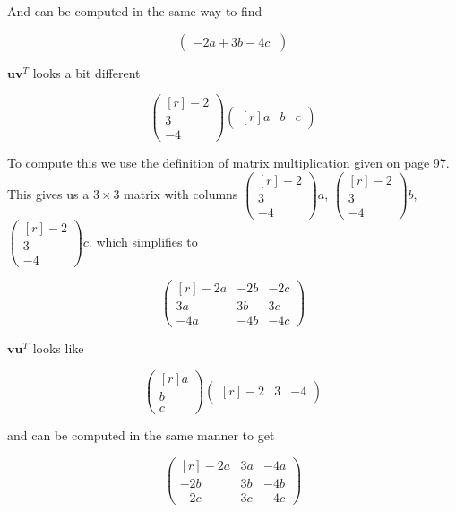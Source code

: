 \documentclass[11pt]{amsart}
\begin{document}
And can be computed in the same way to find

\[
\begin{pmatrix}
-2a+3b-4c\
\end{pmatrix}
\]

$\textbf{uv}^T$ looks a bit different 

\[
\begin{pmatrix*}[r]
-2\\
3\\
-4
\end{pmatrix*}
\begin{pmatrix*}[r]
a&b&c
\end{pmatrix*}
\]

To compute this we use the definition of matrix multiplication given on page 97. This gives us a $3\times3$ matrix with columns $
\begin{pmatrix*}[r]
-2\\
3\\
-4
\end{pmatrix*}a$, $
\begin{pmatrix*}[r]
-2\\
3\\
-4
\end{pmatrix*}b$, $
\begin{pmatrix*}[r]
-2\\
3\\
-4
\end{pmatrix*}c$. which simplifies to 

\[
\begin{pmatrix*}[r]
-2a&-2b&-2c\\
3a&3b&3c\\
-4a&-4b&-4c
\end{pmatrix*}
\]

$\textbf{vu}^T$ looks like 

\[
\begin{pmatrix*}[r]
a\\
b\\
c
\end{pmatrix*}
\begin{pmatrix*}[r]
-2&3&-4
\end{pmatrix*}
\]

and can be computed in the same manner to get

\[
\begin{pmatrix*}[r]
-2a&3a&-4a\\
-2b&3b&-4b\\
-2c&3c&-4c
\end{pmatrix*}
\]
\end{document}
